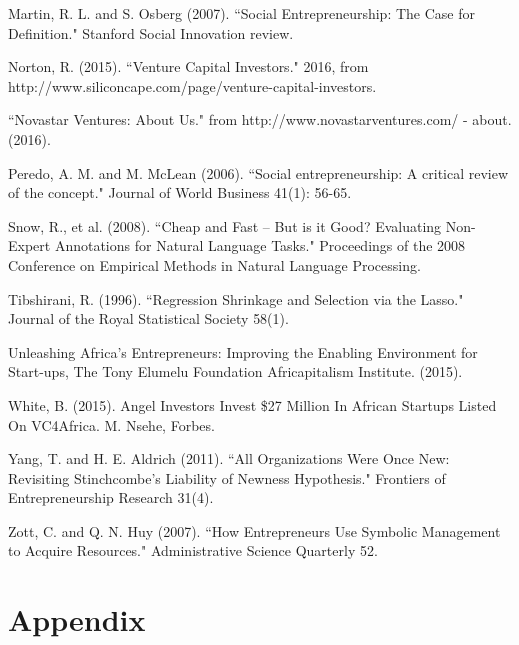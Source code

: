 \documentclass[12pt]{article}
\begin{document}
Martin, R. L. and S. Osberg (2007). ``Social Entrepreneurship: The Case for Definition." Stanford Social Innovation review.
	
Norton, R. (2015). ``Venture Capital Investors." 2016, from http://www.siliconcape.com/page/venture-capital-investors.

``Novastar Ventures: About Us." from http://www.novastarventures.com/ - about. (2016). 
	
Peredo, A. M. and M. McLean (2006). ``Social entrepreneurship: A critical review of the concept." Journal of World Business 41(1): 56-65.
	
Snow, R., et al. (2008). ``Cheap and Fast -- But is it Good? Evaluating Non-Expert Annotations for Natural Language Tasks." Proceedings of the 2008 Conference on Empirical Methods in Natural Language Processing.
	
Tibshirani, R. (1996). ``Regression Shrinkage and Selection via the Lasso." Journal of the Royal Statistical Society 58(1).

Unleashing Africa's Entrepreneurs: Improving the Enabling Environment for Start-ups, The Tony Elumelu Foundation Africapitalism Institute. (2015). 
	
White, B. (2015). Angel Investors Invest \$27 Million In African Startups Listed On VC4Africa. M. Nsehe, Forbes.
	
Yang, T. and H. E. Aldrich (2011). ``All Organizations Were Once New: Revisiting Stinchcombe's Liability of Newness Hypothesis." Frontiers of Entrepreneurship Research 31(4).
	
Zott, C. and Q. N. Huy (2007). ``How Entrepreneurs Use Symbolic Management to Acquire Resources." Administrative Science Quarterly 52.

\endgroup

\clearpage

\section{Appendix}

\setcounter{table}{0}
\renewcommand{\thetable}{A\arabic{table}}

\setcounter{figure}{0}
\renewcommand{\thefigure}{A\arabic{figure}}
\end{document}
